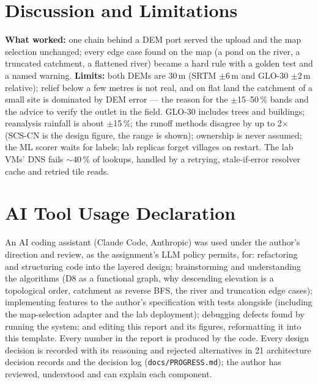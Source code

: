 \documentclass[manuscript,screen,review]{acmart}
\begin{document}
\section{Discussion and Limitations}\label{sec:discussion}
\textbf{What worked:} one chain behind a DEM port served the upload and the map selection
unchanged; every edge case found on the map (a pond on the river, a truncated catchment, a
flattened river) became a hard rule with a golden test and a named warning. \textbf{Limits:} both DEMs are 30\,m (SRTM $\pm$6\,m and GLO-30
$\pm$2\,m relative); relief below a few metres is not real, and on flat land the catchment of
a small site is dominated by DEM error --- the reason for the $\pm$15--50\,\% bands and the
advice to verify the outlet in the field. GLO-30 includes trees and buildings; reanalysis rainfall is about $\pm$15\,\%; the runoff
methods disagree by up to 2$\times$ (SCS-CN is the design figure, the range is shown);
ownership is never assumed; the ML scorer waits for labels; lab replicas forget villages on
restart. The lab VMs' DNS fails $\sim$40\,\% of lookups, handled by a retrying,
stale-if-error resolver cache and retried tile reads.

\section{AI Tool Usage Declaration}
\label{sec:ai-usage}
An AI coding assistant (Claude Code, Anthropic) was used under the author's direction and
review, as the assignment's LLM policy permits, for: refactoring and structuring code into
the layered design; brainstorming and understanding the algorithms (D8 as a functional graph,
why descending elevation is a topological order, catchment as reverse BFS, the river and
truncation edge cases); implementing features to the author's specification with tests
alongside (including the map-selection adapter and the lab deployment); debugging defects
found by running the system; and editing this report and its figures, reformatting it into
this template. Every number in the report is produced by the code. Every design decision is
recorded with its reasoning and rejected alternatives in 21 architecture decision records and
the decision log (\texttt{docs/PROGRESS.md}); the author has reviewed, understood and can
explain each component.




\appendix
\end{document}
